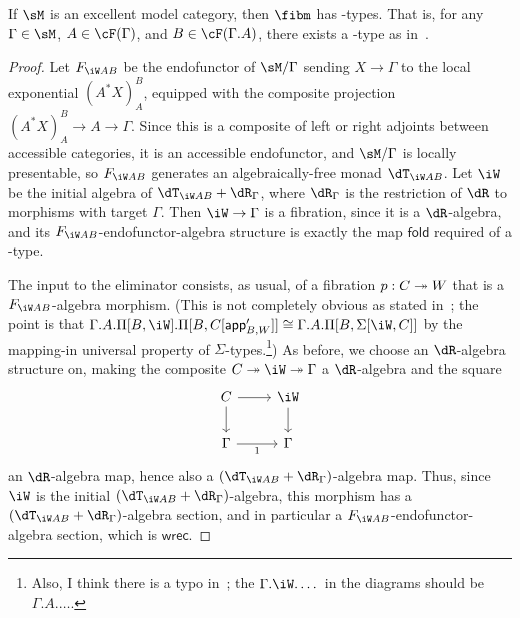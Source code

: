 \documentclass{amsart}
\let\W\iW
\let\F\cF
\def\fold{\mathsf{fold}}
\def\wrec{\mathsf{wrec}}
\begin{document}
\begin{thm}
  If $\sM$ is an excellent model category, then $\fibm$ has \W-types.
  That is, for any $\Gamma\in\sM$, $A\in\F(\Gamma)$, and $B\in\F(\Gamma.A)$, there exists a \W-type as in~\cite[Definition 3.4.4.7]{lw:localuniv}.
\end{thm}
\begin{proof}
  Let $F_{\W A B}$ be the endofunctor of $\sM/\Gamma$ sending $X \to \Gamma$ to the local exponential $(A^*X)^B_A$, equipped with the composite projection $(A^*X)^B_A \to A\to \Gamma$.
  Since this is a composite of left or right adjoints between accessible categories, it is an accessible endofunctor, and $\sM/\Gamma$ is locally presentable, so $F_{\W A B}$ generates an algebraically-free monad $\dT_{\W A B}$.
  Let $\W$ be the initial algebra of $\dT_{\W A B} + \dR_{\Gamma}$, where $\dR_\Gamma$ is the restriction of $\dR$ to morphisms with target $\Gamma$.
  Then $\W\to \Gamma$ is a fibration, since it is a $\dR$-algebra, and its $F_{\W A B}$-endofunctor-algebra structure is exactly the map $\fold$ required of a \W-type.

  The input to the eliminator consists, as usual, of a fibration $p:C\twoheadrightarrow W$ that is a $F_{\W A B}$-algebra morphism.
  (This is not completely obvious as stated in~\cite[Definition 3.4.4.7]{lw:localuniv}; the point is that $\Gamma.A.\Pi[B,\W].\Pi[B,C[\mathsf{app}'_{B,W}]] \cong \Gamma.A.\Pi[B,\Sigma[\W,C]]$ by the mapping-in universal property of $\Sigma$-types.\footnote{Also, I think there is a typo in~\cite[Definition 3.4.4.7]{lw:localuniv}; the $\Gamma.\W.\dots$ in the diagrams should be $\Gamma.A.\dots$.})
  As before, we choose an $\dR$-algebra structure on, making the composite $C\fib \W \fib \Gamma$ a $\dR$-algebra and the square
  \[
  \begin{tikzcd}
    C \ar[d] \ar[r] & \W \ar[d] \\ \Gamma \ar[r,"1",swap]& \Gamma
  \end{tikzcd}
  \]
  an $\dR$-algebra map, hence also a $(\dT_{\W A B} + \dR_{\Gamma})$-algebra map.
  Thus, since $\W$ is the initial $(\dT_{\W A B} + \dR_{\Gamma})$-algebra, this morphism has a $(\dT_{\W A B} + \dR_{\Gamma})$-algebra section, and in particular a $F_{\W A B}$-endofunctor-algebra section, which is $\wrec$.
\end{proof}
\end{document}
